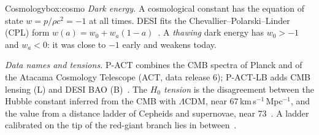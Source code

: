 \begin{primer}{Cosmology}{box:cosmo}
\emph{Dark energy.} A cosmological constant has the equation of state $w=p/\rho c^2=-1$ at all times. DESI fits the
Chevallier--Polarski--Linder (CPL) form $w(a)=w_0+w_a(1-a)$~\cite{chevallier2001,linder2003}. A \emph{thawing} dark energy has $w_0>-1$
and $w_a<0$: it was close to $-1$ early and weakens today.

\emph{Data names and tensions.} P-ACT combines the CMB spectra of Planck and of the Atacama Cosmology Telescope (ACT, data release 6);
P-ACT-LB adds CMB lensing (L) and DESI BAO (B)~\cite{louis2025}. The \emph{$H_0$ tension} is the disagreement between the Hubble constant
inferred from the CMB with $\Lambda$CDM, near 67\,km\,s$^{-1}$\,Mpc$^{-1}$, and the value from a distance ladder of Cepheids and supernovae,
near 73~\cite{planck18,riess2022}. A ladder calibrated on the tip of the red-giant branch lies in between~\cite{freedman2025}.
\end{primer}
